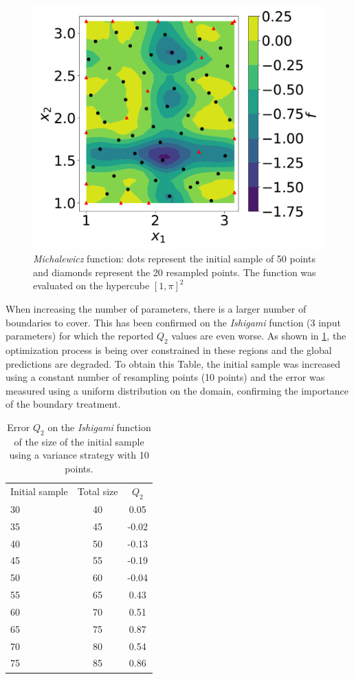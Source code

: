 \begin{figure}[h]
\centering
\includegraphics[width=\linewidth,keepaspectratio]{fig/contributions/resample/3_1column_color-online-only_response_Michalewicz_sigma.pdf}
\caption{\textit{Michalewicz} function: dots represent the initial sample of 50 points and diamonds represent the 20 resampled points. The function was evaluated on the hypercube $[1, \pi]^2$}
\label{fig:rs-michalewicz}
\end{figure}

When increasing the number of parameters, there is a larger number of boundaries to cover. This has been confirmed on the \textit{Ishigami} function (3 input parameters) for which the reported $Q_2$ values are even worse. As shown in \cref{tab:size-q2-ishigami}, the optimization process is being over constrained in these regions and the global predictions are degraded. To obtain this Table, the initial sample was increased using a constant number of resampling points (10 points) and the error was measured using a uniform distribution on the domain, confirming the importance of the boundary treatment.

\begin{table}[h]
\centering
\begin{tabular}{lcc}
\toprule
Initial sample&Total size & $Q_2$ \\
\cmidrule{1-3}
30 & 40 & 0.05  \\
35 & 45 & -0.02 \\
40 & 50 & -0.13 \\
45 & 55 & -0.19 \\
50 & 60 & -0.04 \\
55 & 65 & 0.43  \\
60 & 70 & 0.51  \\
65 & 75 & 0.87  \\
70 & 80 & 0.54  \\
75 & 85 & 0.86  \\
\bottomrule
\end{tabular}
\caption{Error $Q_2$ on the \textit{Ishigami} function of the size of the initial sample using a variance strategy with 10 points.}
\label{tab:size-q2-ishigami}
\end{table}

